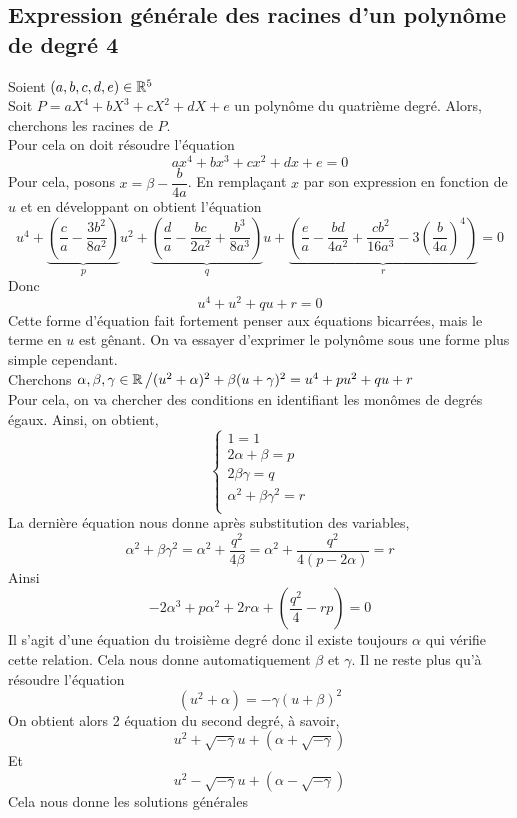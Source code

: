 \documentclass{classe}
\begin{document}
\subsection{Expression générale des racines d'un polynôme de degré 4}
Soient $(a,b,c,d,e)\in\mathbb{R}^5$\\
Soit $P = aX^4+bX^3+cX^2+dX+e$ un polynôme du quatrième degré. Alors, cherchons les racines de $P$.\\ 
Pour cela on doit résoudre l'équation 
\[ax^4+bx^3+cx^2+dx+e=0\]
Pour cela, posons $x = \beta - \dfrac{b}{4a}$. En remplaçant $x$ par son expression en fonction de $u$ et en développant on obtient l'équation
\[
u^4+\underbrace{\left(\dfrac{c}{a}-\dfrac{3b^2}{8a^2}\right)}_{p}u^2 + \underbrace{\left(\dfrac{d}{a}-\dfrac{bc}{2a^2}+\dfrac{b^3}{8a^3}\right)}_{q}u + \underbrace{\left(\dfrac{e}{a}-\dfrac{bd}{4a^2}+\dfrac{c b^2}{16a^3}-3\left(\dfrac{b}{4a}\right)^4\right)}_{r}= 0
\]
Donc 
\[
u^4+u^2+qu+r=0
\]
Cette forme d'équation fait fortement penser aux équations bicarrées, mais le terme en $u$ est gênant. On va essayer d'exprimer le polynôme sous une forme plus simple cependant.\\
Cherchons $\alpha, \beta, \gamma \in \mathbb{R} \left/(u^2+\alpha)^2+\beta (u+\gamma)^2=u^4+pu^2+qu+r\right.$\\
Pour cela, on va chercher des conditions en identifiant les monômes de degrés égaux. Ainsi, on obtient, 
\[
\left\{\begin{array}{l}
1=1\\
2\alpha+\beta = p\\
2 \beta \gamma = q\\
\alpha^2+\beta \gamma^2 = r\\
\end{array}\right.
\] 
La dernière équation nous donne après substitution des variables,
\[
\alpha^2+\beta \gamma^2=\alpha^2 + \dfrac{q^2}{4\beta}=\alpha^2 + \dfrac{q^2}{4(p-2\alpha)}=r
\]
Ainsi 
\[
-2\alpha^3+p\alpha^2+2r\alpha+\left(\dfrac{q^2}{4}-rp\right)=0
\]
Il s'agit d'une équation du troisième degré donc il existe toujours $\alpha$ qui vérifie cette relation. Cela nous donne automatiquement $\beta$ et $\gamma$. Il ne reste plus qu'à résoudre l'équation 
\[
(u^2+\alpha)=-\gamma(u+\beta)^2
\]
On obtient alors 2 équation du second degré, à savoir,
\[
u^2 + \sqrt{-\gamma}u + \left(\alpha + \sqrt{-\gamma}\right)
\]
Et
\[
u^2 - \sqrt{-\gamma}u + \left(\alpha - \sqrt{-\gamma}\right)
\]
Cela nous donne les solutions générales

\end{document}
